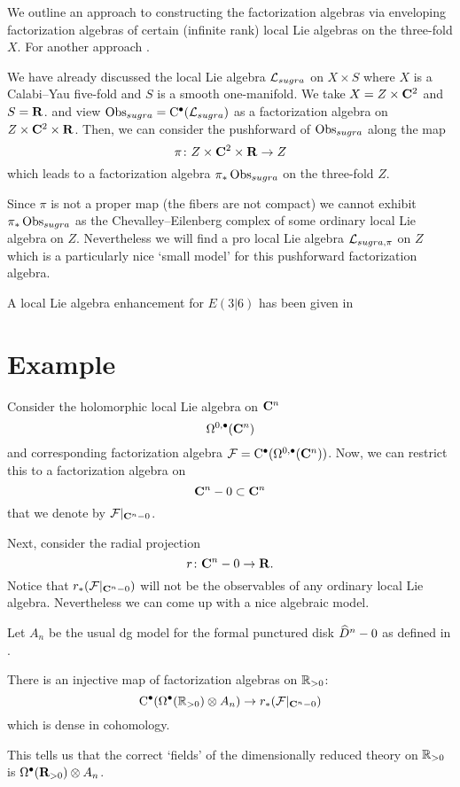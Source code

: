 \documentclass[11pt]{amsart}%
\begin{document}
We outline an approach to constructing the factorization algebras via enveloping factorization algebras of certain (infinite rank) local Lie algebras on the three-fold $X$. 
For another approach . 

We have already discussed the local Lie algebra $\cL_{sugra}$ on $X \times S$ where $X$ is a Calabi--Yau five-fold and $S$ is a smooth one-manifold. 
We take $X = Z \times \C^2$ and $S = \R$. 
and view $\Obs_{sugra} = \clie^\bu(\cL_{sugra})$ as a factorization algebra on $Z \times \C^2 \times \R$. 
Then, we can consider the pushforward of $\Obs_{sugra}$ along the map
\[
\pi \colon Z \times \C^2 \times \R \to Z 
\]
which leads to a factorization algebra $\pi_* \Obs_{sugra}$ on the three-fold $Z$. 

Since $\pi$ is not a proper map (the fibers are not compact) we cannot exhibit $\pi_*\Obs_{sugra}$ as the Chevalley--Eilenberg complex of some ordinary local Lie algebra on $Z$. 
Nevertheless we will find a pro local Lie algebra $\cL_{sugra,\pi}$ on $Z$ which is a particularly nice `small model' for this pushforward factorization algebra.

A local Lie algebra enhancement for $E(3|6)$ has been given in \cite{SWsuca6d} 







\section{Example} 

Consider the holomorphic local Lie algebra on $\C^n$
\[
\Omega^{0,\bu}(\C^n) 
\]
and corresponding factorization algebra $\cF = \clie^\bu(\Omega^{0,\bu}(\C^n))$. 
Now, we can restrict this to a factorization algebra on
\[
\C^n - 0 \subset \C^n
\]
that we denote by $\cF|_{\C^n - 0}$. 

Next, consider the radial projection
\[
r \colon \C^n - 0 \to \R .
\]
Notice that $r_* (\cF|_{\C^n - 0})$ will not be the observables of any ordinary local Lie algebra.
Nevertheless we can come up with a nice algebraic model.  

Let $A_n$ be the usual dg model for the formal punctured disk $\Hat{D}^n - 0$ as defined in \cite{FHK,GWkm}.

\begin{lem}
There is an injective map of factorization algebras on $\RR_{>0}$:
\[
\clie^\bu(\Omega^\bu(\RR_{>0}) \otimes A_n) \to r_* (\cF|_{\C^n - 0}) 
\]
which is dense in cohomology.
\end{lem}

This tells us that the correct `fields' of the dimensionally reduced theory on $\RR_{>0}$ is $\Omega^\bu(\R_{>0}) \otimes A_n$. 
\end{document}
